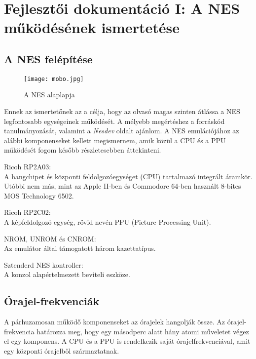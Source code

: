 \chapter{Fejlesztői dokumentáció I: A NES működésének ismertetése} %
\label{ch:impl}

\section{A NES felépítése}

\begin{figure}[H]
	\centering
	\texttt{[image: mobo.jpg]}
	\caption{A NES alaplapja\protect\footnotemark}
\end{figure}

Ennek az ismertetőnek az a célja, hogy az olvasó magas szinten átlássa a NES legfontosabb egységeinek működését. A mélyebb megértéshez a forráskód tanulmányozását, valamint a \emph{Nesdev}\cite{ref} oldalt ajánlom.
A NES emulációjához az alábbi komponenseket kellett megismernem, amik közül a CPU és a PPU működését fogom később részletesebben áttekinteni.

\begin{compactdesc}
	\item[Ricoh RP2A03:] 
	\hfill \\
	A hangchipet és központi feldolgozóegységet (CPU) tartalmazó integrált áramkör. Utóbbi nem más, mint az Apple II-ben és Commodore 64-ben használt 8-bites MOS Technology 6502.
	\item[Ricoh RP2C02:]
	\hfill \\
	A képfeldolgozó egység, rövid nevén PPU (Picture Processing Unit).
	\item[NROM\cite{nromref}, UNROM\cite{unromref} és CNROM\cite{cnromref}:] 
	\hfill \\
	Az emulátor által támogatott három kazettatípus.
	\item[Sztenderd NES kontroller\cite{control}:]
	\hfill \\
	A konzol alapértelmezett beviteli eszköze.
\end{compactdesc}

\section{Órajel-frekvenciák \cite{nesclocks}}
A párhuzamosan működő komponenseket az órajelek hangolják össze. Az órajel-frekvencia határozza meg, hogy egy másodperc alatt hány atomi műveletet végez el egy komponens.
A CPU és a PPU is rendelkezik saját órajelfrekvenciával, amit egy központi órajelből származtatnak.


